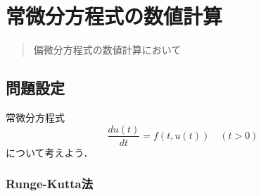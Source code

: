 \chapter{常微分方程式の数値計算}
\begin{abstract}
偏微分方程式の数値計算において
\end{abstract}

\section{問題設定}
常微分方程式
$$
\frac{du(t)}{dt}=f(t,u(t))\quad(t>0)
$$
について考えよう．

\subsection{Runge-Kutta法}
